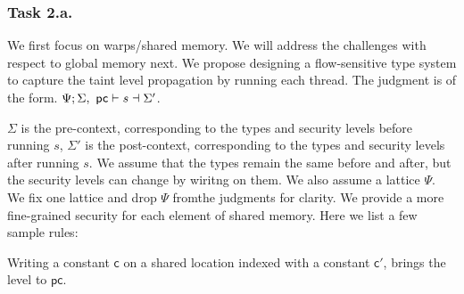 \subsubsection{Task 2.a.} 
We first focus on warps/shared memory.
%
We will address the challenges with respect to global memory next.
%
We propose designing a flow-sensitive type system to capture the taint level propagation by running each thread.
%
The judgment is of the form.
%
$\Psi; \Sigma, \pc \vdash s \dashv \Sigma'$.


$\Sigma$ is the pre-context, corresponding to the types and security levels before running $s$,
$\Sigma'$ is the post-context, corresponding to the types and security levels after running $s$.
%
We assume that the types remain the same before and after, but the security levels can change by wiritng on them.
%
%
%
We also assume a lattice $\Psi$.
%
We fix one lattice and drop $\Psi$ fromthe judgments for clarity.
%
We provide a more fine-grained security for each element of shared memory.
%
Here we list a few sample rules:

Writing a constant $\mathsf{c}$ on a shared location indexed with a constant $\mathsf{c}'$, brings the level to $\mathsf{pc}$.
\begin{mathpar}
\end{mathpar}


\begin{mathpar}
    \end{mathpar}




